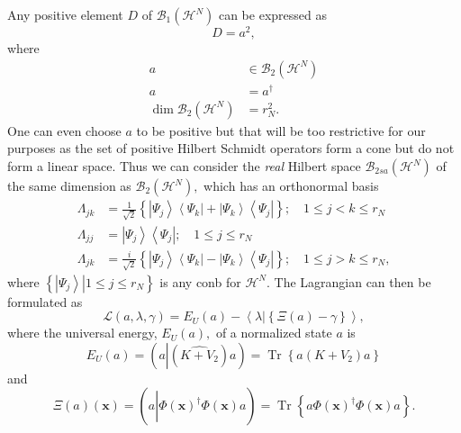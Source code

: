\documentclass[aps,preprint]{revtex4}%
\begin{document}
Any positive element $D$ of $\mathcal{B}_{1}\left(  \mathcal{H}^{N}\right)  $
can be expressed as
\begin{equation}
D=a^{2},
\end{equation}
where
\begin{align}
a  &  \in\mathcal{B}_{2}\left(  \mathcal{H}^{N}\right) \nonumber\\
a  &  =a^{\dagger}\nonumber\\
\dim\mathcal{B}_{2}\left(  \mathcal{H}^{N}\right)   &  =r_{N}^{2}.
\end{align}
One can even choose $a$ to be positive but that will be too restrictive for
our purposes as the set of positive Hilbert Schmidt operators form a cone but
do not form a linear space. Thus we can consider the \emph{real} Hilbert space
$\mathcal{B}_{2sa}\left(  \mathcal{H}^{N}\right)  $ of the same dimension as
$\mathcal{B}_{2}\left(  \mathcal{H}^{N}\right)  ,$ which has an orthonormal
basis
\begin{align}
\Lambda_{jk}  &  =\frac{1}{\sqrt{2}}\left\{  \left\vert \Psi_{j}\right\rangle
\left\langle \Psi_{k}\right\vert +\left\vert \Psi_{k}\right\rangle
\left\langle \Psi_{j}\right\vert \right\}  ;\quad1\leq j<k\leq r_{N}%
\nonumber\\
\Lambda_{jj}  &  =\left\vert \Psi_{j}\right\rangle \left\langle \Psi
_{j}\right\vert ;\quad1\leq j\leq r_{N}\nonumber\\
\Lambda_{jk}  &  =\frac{i}{\sqrt{2}}\left\{  \left\vert \Psi_{j}\right\rangle
\left\langle \Psi_{k}\right\vert -\left\vert \Psi_{k}\right\rangle
\left\langle \Psi_{j}\right\vert \right\}  ;\quad1\leq j>k\leq r_{N},
\end{align}
where $\left\{  \left.  \left\vert \Psi_{j}\right\rangle \right\vert 1\leq
j\leq r_{N}\right\}  $ is any conb for $\mathcal{H}^{N}.$ The Lagrangian can
then be formulated as
\begin{equation}
\mathcal{L}\left(  a,\lambda,\gamma\right)  =E_{U}\left(  a\right)
-\left\langle \lambda\left\vert \left\{  \Xi\left(  a\right)  -\gamma\right\}
\right.  \right\rangle ,
\end{equation}
where the universal energy, $E_{U}\left(  a\right)  ,$ of a normalized state
$a$ is
\begin{equation}
E_{U}\left(  a\right)  =\left(  a\left\vert \left(  \widehat{K+V_{2}}\right)
\right.  a\right)  =\operatorname{Tr}\left\{  a\left(  K+V_{2}\right)
a\right\}
\end{equation}
and
\begin{equation}
\Xi\left(  a\right)  \left(  \mathbf{x}\right)  =\left(  a\left\vert
\widehat{\Phi\left(  \mathbf{x}\right)  ^{\dagger}\Phi\left(  \mathbf{x}%
\right)  }\right.  a\right)  =\operatorname{Tr}\left\{  a\Phi\left(
\mathbf{x}\right)  ^{\dagger}\Phi\left(  \mathbf{x}\right)  a\right\}  .
\end{equation}
\end{document}
